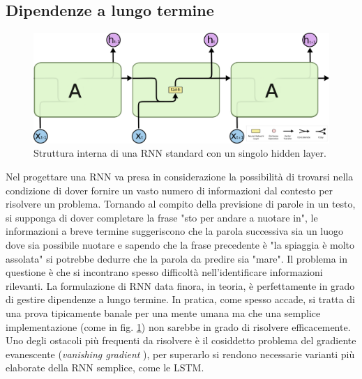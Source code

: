 \subsection{Dipendenze a lungo termine} %
\label{sub:dipendenze_a_lungo_termine}
\begin{figure}[ht]
	\centering
	\includegraphics{img/rnn_struct.png}
	\caption{Struttura interna di una RNN standard con un singolo hidden layer.}
	\label{fig:1.8}
\end{figure}
Nel progettare una RNN va presa in considerazione la possibilità di trovarsi nella condizione di dover fornire un vasto numero di informazioni dal contesto per risolvere un problema. Tornando al compito della previsione di parole in un testo, si supponga di dover completare la frase "sto per andare a nuotare in", le informazioni a breve termine suggeriscono che la parola successiva sia un luogo dove sia possibile nuotare e sapendo che la frase precedente è "la spiaggia è molto assolata" si potrebbe dedurre che la parola da predire sia "mare". Il problema in questione è che si incontrano spesso difficoltà nell'identificare informazioni rilevanti. La formulazione di RNN data finora, in teoria, è perfettamente in grado di gestire dipendenze a lungo termine. In pratica, come spesso accade, si tratta di una prova tipicamente banale per una mente umana ma che una semplice implementazione (come in fig. \ref{fig:1.8}) non sarebbe in grado di risolvere efficacemente. Uno degli ostacoli più frequenti da risolvere è il cosiddetto problema del gradiente evanescente (\textit{vanishing gradient} \cite{vanishing}), per superarlo si rendono necessarie varianti più elaborate della RNN semplice, come le LSTM.
